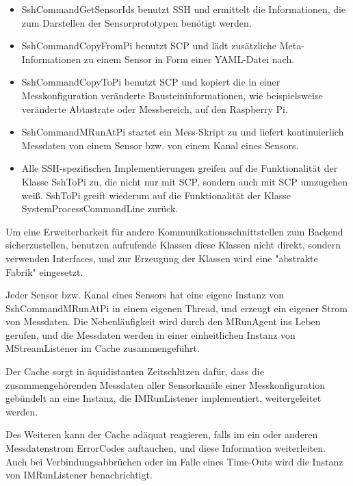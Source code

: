 \documentclass[parskip=full]{scrartcl}
\begin{document}
\begin{itemize}
	
\item SshCommandGetSensorIds benutzt SSH und ermittelt die Informationen, die zum Darstellen der Sensorprototypen benötigt werden.

\item SshCommandCopyFromPi benutzt SCP und lädt zusätzliche Meta-Informationen zu einem Sensor in Form einer YAML-Datei nach. 

\item SshCommandCopyToPi benutzt SCP und kopiert die in einer Messkonfiguration veränderte Bausteininformationen, wie beispielsweise veränderte Abtastrate oder Messbereich, auf den Raspberry Pi.

\item SshCommandMRunAtPi startet ein Mess-Skript zu und liefert kontinuierlich Messdaten von einem Sensor bzw. von einem Kanal eines Sensors. 

\item Alle SSH-spezifischen Implementierungen greifen auf die Funktionalität der Klasse SshToPi zu, die nicht nur mit SCP, sondern auch mit SCP umzugehen weiß. SshToPi greift wiederum auf die Funktionalität der Klasse SystemProcessCommandLine zurück. 

\end{itemize}

Um eine Erweiterbarkeit für andere Kommunikationsschnittstellen zum Backend sicherzustellen, benutzen aufrufende Klassen diese Klassen nicht direkt, sondern verwenden Interfaces, und zur Erzeugung der Klassen wird eine "abstrakte Fabrik" eingesetzt. 

Jeder Sensor bzw. Kanal eines Sensors hat eine eigene Instanz von SshCommandMRunAtPi in einem eigenen Thread, und erzeugt ein eigener Strom von Messdaten. Die Nebenläufigkeit wird durch den MRunAgent ins Leben gerufen, und die Messdaten werden in einer einheitlichen Instanz von MStreamListener im Cache zusammengeführt. 

Der Cache sorgt in äquidistanten Zeitschlitzen dafür, dass die zusammengehörenden Messdaten aller Sensorkanäle einer Messkonfiguration gebündelt an eine Instanz, die IMRunListener implementiert, weitergeleitet werden. 

Des Weiteren kann der Cache adäquat reagieren, falls im ein oder anderen Messdatenstrom ErrorCodes auftauchen, und diese Information weiterleiten. Auch bei Verbindungsabbrüchen oder im Falle eines Time-Outs wird die Instanz von IMRunListener benachrichtigt. 
\end{document}
